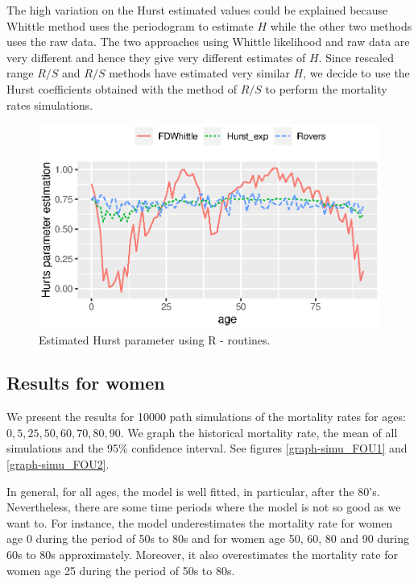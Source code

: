 \documentclass[smallextended]{svjour3}
\begin{document}
        The high variation on the Hurst estimated values could be explained 
    because Whittle method uses the periodogram to estimate $H$ while the other 
    two methods uses the raw data.
    The two approaches using Whittle likelihood and raw data are very different 
    and hence they give very different estimates of $H$. Since rescaled range 
    $R/S$ and $R/S$  methods have estimated very similar $H$, we decide to use 
    the Hurst coefficients obtained with the method of $R/S$ to perform the 
    mortality  rates simulations.
%
    \begin{figure}[H]
        \label{graph-Hurst_Est_Me}
        \includegraphics{Hurst-Men.eps}
        \caption{Estimated Hurst parameter using R - routines.}
    \end{figure}
    \subsection{Results for women}
    \label{re-wom}

        We present the results for \num{10000} path simulations of the 
    mortality rates for ages: 
    $
        \num{0}, \num{5}, \num{25}, 
        \num{50},\num{60}, \num{70}, 
        \num{80},\num{90}
    $.
        We graph the historical mortality rate, the mean of all simulations and 
    the \num{95}\% confidence interval. See figures \ref{graph-simu_FOU1} and
    \ref{graph-simu_FOU2}.

        In general, for all ages, the model is well fitted, in particular,
    after the \num{80}'s. Nevertheless, there are some time periods where the 
    model is not so good as we want to. For instance, the model underestimates 
    the mortality rate for women age \num{0} during the period of 
    \num{50}s to \num{80}s and for women age \num{50}, \num{60},
    \num{80} and \num{90} during \num{60}s to \num{80}s approximately. 
    Moreover, it also overestimates the mortality rate for
    women age \num{25} during the period of \num{50}s to \num{80}s.
\end{document}

